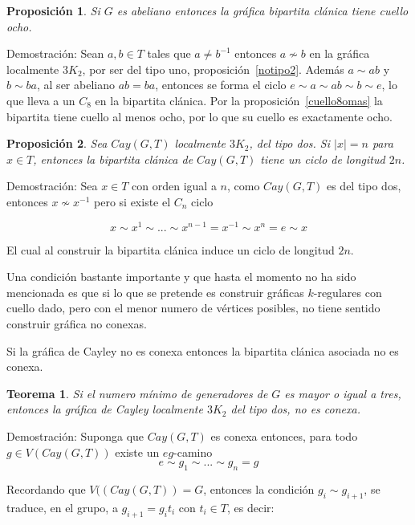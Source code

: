 \documentclass[11pt]{book}
\newtheorem{theorem}{Teorema}
\newtheorem{proposition}{Proposición}
\theoremstyle{definition}
\begin{document}
\begin{proposition}\label{bipcuello8}
  Si $G$ es abeliano entonces la gráfica bipartita clánica tiene
  cuello ocho.
\end{proposition}

Demostración: Sean $a,b\in T$ tales que $a\not=b^{-1}$ entonces
$a\not\sim b$ en la gráfica localmente $3K_2$, por ser del tipo uno,
proposición~\ref{notipo2}.  Además $a\sim ab$ y $b \sim ba$, al ser
abeliano $ab=ba$, entonces se forma el ciclo $e\sim a\sim ab\sim b\sim
e$, lo que lleva a un $C_8$ en la bipartita clánica. Por la
proposición~\ref{cuello8omas} la bipartita tiene cuello al menos ocho,
por lo que su cuello es exactamente ocho.

\begin{proposition}\label{Bciclo2n}
  Sea $Cay(G,T)$ localmente $3K_2$, del tipo dos. Si $|x|=n$ para
  $x\in T$, entonces la bipartita clánica de $Cay(G,T)$ tiene un ciclo
  de longitud $2n$.
\end{proposition}

Demostración: Sea $x\in T$ con orden igual a $n$, como $Cay(G,T)$ es
del tipo dos, entonces $x\nsim x^{-1}$ pero si existe el $C_n$ ciclo

\begin{equation*}
  x\sim x^1\sim ...\sim x^{n-1}=x^{-1} \sim x^{n}=e \sim x
\end{equation*} 

El cual al construir la bipartita clánica induce un ciclo de longitud
$2n$.

Una condición bastante importante y que hasta el momento no ha sido
mencionada es que si lo que se pretende es construir gráficas
$k$-regulares con cuello dado, pero con el menor numero de vértices
posibles, no tiene sentido construir gráfica no conexas.

Si la gráfica de Cayley no es conexa entonces la bipartita clánica
asociada no es conexa.

\begin{theorem}\label{Cayconexa2}
  Si el numero mínimo de generadores de $G$ es mayor o igual a tres,
  entonces la gráfica de Cayley localmente $3K_2$ del tipo dos, no es
  conexa.
\end{theorem}

Demostración: Suponga que $Cay(G,T)$ es conexa entonces, para todo
$g\in V(Cay(G,T))$ existe un $eg$-camino $$e\sim g_1\sim ... \sim g_n
=g$$

Recordando que $V((Cay(G,T))=G$, entonces la condición $g_i\sim
g_{i+1}$, se traduce, en el grupo, a $g_{i+1}=g_{i}t_i$ con $t_i\in
T$, es decir:
\end{document}
